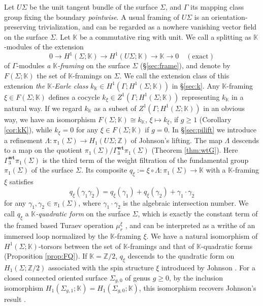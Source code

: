\documentclass[a4paper,12pt, twoside]{amsart}
\theoremstyle{definition}
\theoremstyle{remark}
\numberwithin{equation}{section}
\newcommand\bK{{\mathbb{K}}}
\newcommand\bZ{{\mathbb{Z}}}
\newcommand\Gwt{\Gamma^{\mathbf{wt}}}
\newcommand\La{\Lambda}
\newcommand\Sgone{\Sigma_{g,1}}
\begin{document}
Let $U\Sigma$ be the unit tangent bundle of the surface $\Sigma$, and 
$\Gamma$ its mapping class group fixing the boundary {\it pointwise}. 
A usual framing of $U\Sigma$ is an orientation-preserving trivialization, and can be regarded as a nowhere vanishing vector field on the surface $\Sigma$. 
Let $\bK$ be a commutative ring with unit. We call a splitting as $\bK$-modules of the extension 
$$
0 \to H^1(\Sigma; \bK) \to H^1(U\Sigma; \bK) \to \bK \to 0
\quad (\text{exact})
$$
of $\Gamma$-modules {\it a $\bK$-framing} on the surface $\Sigma$ (\S \ref{sec:frame}), 
and denote by $F(\Sigma; \bK)$ the set of $\bK$-framings on $\Sigma$.
We call the extension class of this extension {\it the $\bK$-Earle class} 
$k_\bK \in H^1(\Gamma; H^1(\Sigma; \bK))$ in \S\ref{sec:k}. 
Any $\bK$-framing $\xi \in F(\Sigma; \bK)$ defines a cocycle $k_\xi \in Z^1(\Gamma; H^1(\Sigma; \bK))$ representing $k_\bK$ in a natural way.
If we regard $k_\bK$ as a subset of $Z^1(\Gamma; H^1(\Sigma; \bK))$ in an obvious way, we have an isomorphism $F(\Sigma; \bK) \cong k_\bK$, $\xi \mapsto k_\xi$, if $g \geq 1$ (Corollary \ref{cor:kK}), while $k_\xi = 0$ for any $\xi \in F(\Sigma; \bK)$ if $g = 0$. 
In \S\ref{sec:pilift} we introduce a refinement 
$\La: \pi_1(\Sigma) \to  H_1(U\Sigma; \bZ)$ of Johnson's lifting.
The map $\La$ descends to a map on the quotient $\pi_1(\Sigma)/\Gwt_3\pi_1(\Sigma)$ (Theorem \ref{thm:wtG}). Here $\Gwt_3\pi_1(\Sigma)$ is the third term of the weight filtration of the fundamental group $\pi_1(\Sigma)$ of the surface $\Sigma$. 
Its composite $q_\xi := \xi\circ\La: \pi_1(\Sigma) \to \bK$ 
with a $\bK$-framing $\xi$ satisfies 
$$
q_\xi(\gamma_1\gamma_2)  = q_\xi(\gamma_1) + q_\xi(\gamma_2) + \gamma_1\cdot\gamma_2
$$
for any $\gamma_1, \gamma_2 \in \pi_1(\Sigma)$, where $\gamma_1\cdot\gamma_2$ is the algebraic intersection number. 
We call $q_\xi$ a {\it $\bK$-quadratic form} on the surface $\Sigma$, 
which is exactly the constant term of the framed based Turaev operation $\mu^\xi_r$ \cite{Tu1979, AKKNa, AKKN18, %
AKKNb, Tan25b}, and can be interpreted as a writhe of an immersed loop normalized by the $\bK$-framing $\xi$. 
We have a natural isomorphism of $H^1(\Sigma; \bK)$-torsors between the set of $\bK$-framings and that of $\bK$-quadratic forms (Proposition \ref{prop:FQ}). 
If $\bK = \bZ/2$, $q_\xi$ descends to the quadratic form on $H_1(\Sigma; \bZ/2)$ associated with the spin structure $\xi$ introduced by Johnson \cite{J80a}. 
For a closed connected oriented surface $\Sigma_{g,0}$ of genus $g \geq 0$, 
by the inclusion isomorphism $H_1(\Sgone; \bK) = H_1(\Sigma_{g,0}; \bK)$, this isomorphism recovers Johnson's result \cite[Theorem 3.A, p.371]{J80a}.
\end{document}
